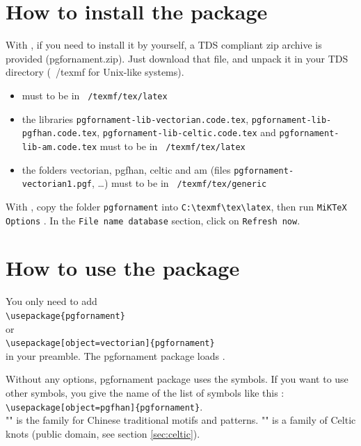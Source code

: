 \documentclass[a4paper,nofonts]{tufte-handout}
\begin{document}
\tableofcontents

\vspace{1cm}
\hfil  {}\hfil

\listoffigures

\vspace{1cm}
\hfil  {}\hfil

\section{How to install the package}
\label{sec:how_to_install}
With , if you need to install it by yourself, a TDS compliant zip archive is
provided (pgfornament.zip).  Just download that file, and unpack it in
your TDS directory (~/texmf for Unix-like systems).
\begin{itemize}
  \item {}  must to be in \texttt{~/texmf/tex/latex}
  \item the libraries \texttt{pgfornament-lib-vectorian.code.tex}, \texttt{pgfornament-lib-pgfhan.code.tex},
        \texttt{pgfornament-lib-celtic.code.tex} and \texttt{pgfornament-lib-am.code.tex} must to be in \texttt{~/texmf/tex/latex}
  \item the folders vectorian, pgfhan, celtic and am (files \texttt{pgfornament-vectorian1.pgf}, \dots) must to be in \texttt{~/texmf/tex/generic}
\end{itemize}

With , copy the folder {\color{black}\texttt{pgfornament}} into \verb+C:\texmf\tex\latex+, then
run {\color{red}\texttt{MiKTeX Options}}  . In the {\color{black}\texttt{File name database}}  section, click on  {\color{red}\texttt{Refresh now}}.

\section{How to use the package}
\label{sec:how_to_use}
You only need to add \\
{\color{black}\verb+\usepackage{pgfornament}+} \\ or  \\{\color{black}\verb+\usepackage[object=vectorian]{pgfornament}+}\\
 in your preamble. The  pgfornament package loads \TIKZ.

 Without any options, pgfornament package uses the  symbols. If you want to use other symbols, you give the name of the list of symbols like this : \\
{\color{black}\verb+\usepackage[object=pgfhan]{pgfornament}+}.\\
"" is the family for Chinese traditional motifs and patterns.
"" is a family of Celtic knots (public domain, see section \ref{sec:celtic}).
\end{document}
